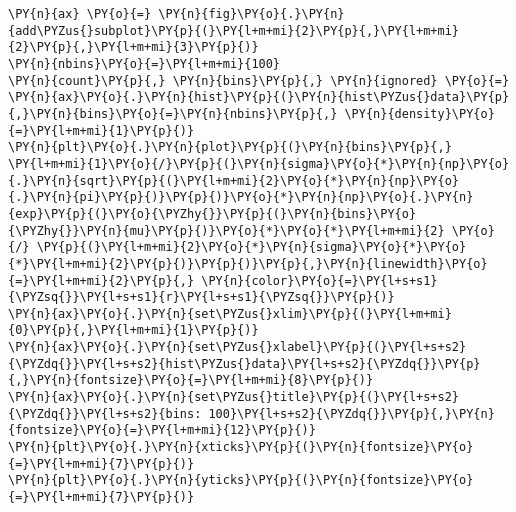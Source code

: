 \begin{tcolorbox}[breakable, size=fbox, boxrule=1pt, pad at break*=1mm,colback=cellbackground, colframe=cellborder]
\begin{Verbatim}[commandchars=\\\{\}]
\PY{n}{ax} \PY{o}{=} \PY{n}{fig}\PY{o}{.}\PY{n}{add\PYZus{}subplot}\PY{p}{(}\PY{l+m+mi}{2}\PY{p}{,}\PY{l+m+mi}{2}\PY{p}{,}\PY{l+m+mi}{3}\PY{p}{)}
\PY{n}{nbins}\PY{o}{=}\PY{l+m+mi}{100}
\PY{n}{count}\PY{p}{,} \PY{n}{bins}\PY{p}{,} \PY{n}{ignored} \PY{o}{=} \PY{n}{ax}\PY{o}{.}\PY{n}{hist}\PY{p}{(}\PY{n}{hist\PYZus{}data}\PY{p}{,}\PY{n}{bins}\PY{o}{=}\PY{n}{nbins}\PY{p}{,} \PY{n}{density}\PY{o}{=}\PY{l+m+mi}{1}\PY{p}{)}
\PY{n}{plt}\PY{o}{.}\PY{n}{plot}\PY{p}{(}\PY{n}{bins}\PY{p}{,} \PY{l+m+mi}{1}\PY{o}{/}\PY{p}{(}\PY{n}{sigma}\PY{o}{*}\PY{n}{np}\PY{o}{.}\PY{n}{sqrt}\PY{p}{(}\PY{l+m+mi}{2}\PY{o}{*}\PY{n}{np}\PY{o}{.}\PY{n}{pi}\PY{p}{)}\PY{p}{)}\PY{o}{*}\PY{n}{np}\PY{o}{.}\PY{n}{exp}\PY{p}{(}\PY{o}{\PYZhy{}}\PY{p}{(}\PY{n}{bins}\PY{o}{\PYZhy{}}\PY{n}{mu}\PY{p}{)}\PY{o}{*}\PY{o}{*}\PY{l+m+mi}{2} \PY{o}{/} \PY{p}{(}\PY{l+m+mi}{2}\PY{o}{*}\PY{n}{sigma}\PY{o}{*}\PY{o}{*}\PY{l+m+mi}{2}\PY{p}{)}\PY{p}{)}\PY{p}{,}\PY{n}{linewidth}\PY{o}{=}\PY{l+m+mi}{2}\PY{p}{,} \PY{n}{color}\PY{o}{=}\PY{l+s+s1}{\PYZsq{}}\PY{l+s+s1}{r}\PY{l+s+s1}{\PYZsq{}}\PY{p}{)}
\PY{n}{ax}\PY{o}{.}\PY{n}{set\PYZus{}xlim}\PY{p}{(}\PY{l+m+mi}{0}\PY{p}{,}\PY{l+m+mi}{1}\PY{p}{)}
\PY{n}{ax}\PY{o}{.}\PY{n}{set\PYZus{}xlabel}\PY{p}{(}\PY{l+s+s2}{\PYZdq{}}\PY{l+s+s2}{hist\PYZus{}data}\PY{l+s+s2}{\PYZdq{}}\PY{p}{,}\PY{n}{fontsize}\PY{o}{=}\PY{l+m+mi}{8}\PY{p}{)}
\PY{n}{ax}\PY{o}{.}\PY{n}{set\PYZus{}title}\PY{p}{(}\PY{l+s+s2}{\PYZdq{}}\PY{l+s+s2}{bins: 100}\PY{l+s+s2}{\PYZdq{}}\PY{p}{,}\PY{n}{fontsize}\PY{o}{=}\PY{l+m+mi}{12}\PY{p}{)}
\PY{n}{plt}\PY{o}{.}\PY{n}{xticks}\PY{p}{(}\PY{n}{fontsize}\PY{o}{=}\PY{l+m+mi}{7}\PY{p}{)}
\PY{n}{plt}\PY{o}{.}\PY{n}{yticks}\PY{p}{(}\PY{n}{fontsize}\PY{o}{=}\PY{l+m+mi}{7}\PY{p}{)}


\end{Verbatim}
\end{tcolorbox}
